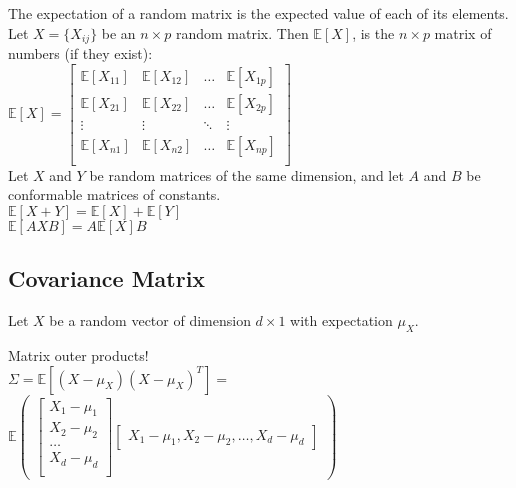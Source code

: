 The expectation of a random matrix is the expected value of each of its elements. Let $X=\{X_{ij}\}$ be an $n \times p$ random matrix. Then $\mathbb{E}[X]$, is the $n \times p$ matrix of numbers (if they exist):\\

$\mathbb{E}[X]= \begin{bmatrix}
   \mathbb{E}[X_{11}]       & \mathbb{E}[X_{12}] & \dots & \mathbb{E}[X_{1p}] \\
   \mathbb{E}[X_{21}]       & \mathbb{E}[X_{22}] & \dots & \mathbb{E}[X_{2p}] \\
    \vdots & \vdots &\ddots & \vdots \\
     \mathbb{E}[X_{n1}]       & \mathbb{E}[X_{n2}] & \dots & \mathbb{E}[X_{np}] \\
\end{bmatrix}$\\

Let $X$ and $Y$ be random matrices of the same dimension, and let $A$ and $B$ be conformable matrices of constants.\\

$\mathbb{E}[X + Y] = \mathbb{E}[X] + \mathbb{E}[Y]$\\
$\mathbb{E}[AXB] = A \mathbb{E}[X] B$\\


\subsection*{Covariance Matrix}
Let $X$  be a random vector of dimension $d \times 1$ with expectation $\mu _{X}$. 

Matrix outer products!\\ 

$\Sigma =\mathbb E[(X- \mu _{X})(X- \mu _{X})^ T] =$\\

$\mathbb{E}  \begin{pmatrix} \begin{bmatrix} 

X_1 - \mu_1\\
X_2 - \mu_2\\
\ldots\\
X_d - \mu_d\\

\end{bmatrix} \begin{bmatrix} X_1 - \mu_1, X_2 - \mu_2,\ldots, X_d - \mu_d \end{bmatrix} \end{pmatrix}$\\

